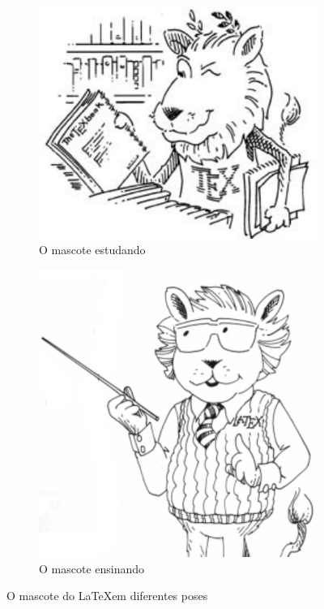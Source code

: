 \begin{figure}[!htpb]
    \centering
    \begin{subfigure}[!htpb]{.45\textwidth}
        \includegraphics[width=\textwidth]{figs/lion}
        \caption{O mascote estudando}
        \label{f_c2_masco1}
    \end{subfigure}
    \begin{subfigure}[!htpb]{.45\textwidth}
        \includegraphics[width=\textwidth]{figs/latex_lion}
        \caption{O mascote ensinando}
        \label{f_c2_masco2}
    \end{subfigure}
	\caption{O mascote do \LaTeX em diferentes poses}
	\label{f_c2_mascotes}
\end{figure}

